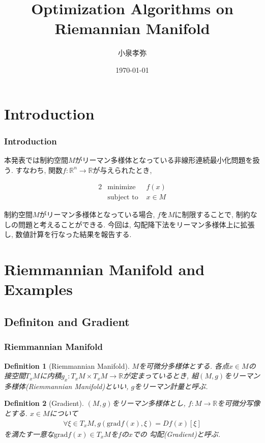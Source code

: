 \documentclass[dvipdfmx,11pt]{beamer}		%
\title{Optimization Algorithms on Riemannian Manifold}
\author{小泉孝弥}
\institute{立命館大学大学院 修士2年}
\date{\today}
\makeatletter
\newtheorem{defi}{Definition}
\newcommand{\R}{\mathbb{R}}
\newcommand{\tpm}{T_xM}
\newcounter{mpproblem}[section]
\newenvironment{mpproblem}[1]%
{%
    \protected@edef\@currentlabelname{#1}%
    \par\vspace{\baselineskip}\noindent%
    \ifx#1\empty %
    \else \refstepcounter{mpproblem}$($#1$)$ %
    \fi%
    \hfill%
    $\left|%
    \hfill%
    \hspace{0.00\textwidth}%
    \@fleqntrue\@mathmargin\parindent%
    \begin{minipage}{0.86\textwidth}%
    \vspace{-1.0\baselineskip}%
}%
{%
    \end{minipage}%
    \@fleqnfalse%
    \right.$%
    \par\vspace{\baselineskip}\noindent%
    \ignorespacesafterend%
}%
\newenvironment{mpproblem*}%
{%
    \begin{mpproblem}{}%
}%
{%
    \end{mpproblem}%
    \ignorespacesafterend%
}
\makeatother
\begin{document}
    \begin{frame}\frametitle{}
        \titlepage
    \end{frame}

    \section{Introduction}
    \begin{frame}
        \frametitle{Introduction}
        本発表では制約空間$M$がリーマン多様体となっている非線形連続最小化問題を扱う. すなわち, 
        関数$f : \R^n\to\R$が与えられたとき, 
        \begin{mpproblem*}
            \begin{alignat*}{2}
                &\text{minimize}   & f(x)  \\
                &\text{subject to } & x\in M  
            \end{alignat*}
        \end{mpproblem*}
        制約空間$M$がリーマン多様体となっている場合, $f$を$M$に制限することで, 制約なしの問題と考えることができる. 
        今回は, 勾配降下法をリーマン多様体上に拡張し, 数値計算を行なった結果を報告する.
    \end{frame}

    \section{Riemmannian Manifold and Examples}
    \subsection{Definiton and Gradient}
    \begin{frame}\frametitle{Riemmannian Manifold}
        \begin{defi}[Riemmannian Manifold]
            $M$を可微分多様体とする. 各点$x\in M$の接空間$\tpm$に内積$g_x : \tpm\times\tpm\to\R$が定まっているとき, 
            組$(M, g)$をリーマン多様体(Riemmannian Manifold)といい, $g$をリーマン計量と呼ぶ.
        \end{defi}
        \begin{defi}[Gradient]
            $(M, g)$をリーマン多様体とし, $f:M\to\R$を可微分写像とする. $x\in M$について
            \begin{align*}
                \forall\xi\in\tpm, g(\mathrm{grad}f(x), \xi) = Df(x)[\xi]
            \end{align*}
            を満たす一意な$\mathrm{grad}f(x)\in\tpm$を$f$の$x$での
            勾配(Gradient)と呼ぶ.
        \end{defi}
    \end{frame}
\end{document}
